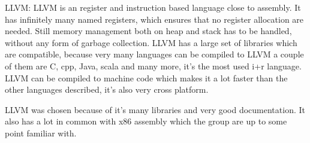 LLVM:
LLVM is an register and instruction based language close to assembly. It has infinitely many named registers, which ensures that no register allocation are needed. Still memory management both on heap and stack has to be handled, without any form of garbage collection. LLVM has a large set of libraries which are compatible, because very many languages can be compiled to LLVM a couple of them are C, cpp, Java, scala and many more, it’s the most used i+r language.  LLVM can be compiled to machine code which makes it a lot faster than the other languages described, it’s also very cross platform. 

LLVM was chosen because of it’s many libraries and very good documentation. It also has a lot in common with x86 assembly which the group are up to some point familiar with. 
